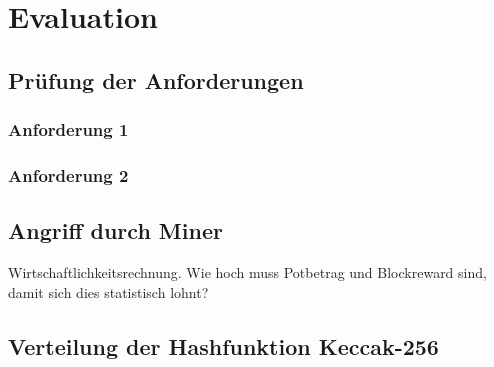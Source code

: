 \section{Evaluation}
\subsection{Prüfung der Anforderungen}

\subsubsection{Anforderung 1}
\subsubsection{Anforderung 2}

\subsection{Angriff durch Miner}

Wirtschaftlichkeitsrechnung. Wie hoch muss Potbetrag und Blockreward sind, damit sich dies statistisch lohnt?

\subsection{Verteilung der Hashfunktion Keccak-256}

